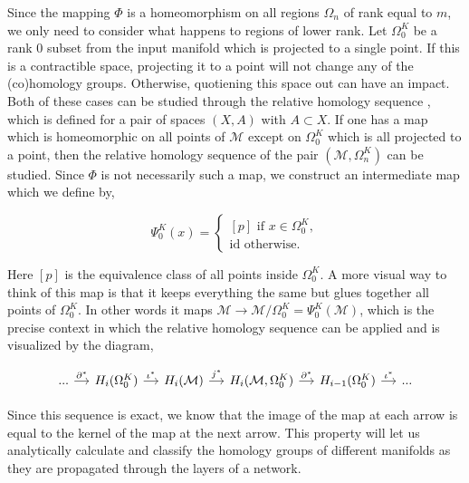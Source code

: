 Since the mapping $\Phi$ is a homeomorphism on all regions $\Omega_n$ of rank equal to $m$, we only need to consider what happens to regions of lower rank. Let $\Omega_0^K$ be a rank 0 subset from the input manifold which is projected to a single point. If this is a contractible space, projecting it to a point will not change any of the (co)homology groups. Otherwise, quotiening this space out can have an impact. Both of these cases can be studied through the relative homology sequence \cite{hatcher2005algebraic}, which is defined for a pair of spaces $(X,A)$ with $A \subset X$. If one has a map which is homeomorphic on all points of $\mathcal{M}$ except on $\Omega_0^K$ which is all projected to a point, then the relative homology sequence of the pair $(\mathcal{M}, \Omega_n^K)$ can be studied. Since $\Phi$ is not necessarily such a map, we construct an intermediate map which we define by,

\begin{equation}
    \Psi^K_0(x) = 
    \begin{cases}
        [p] \text{ if } x \in \Omega^K_0, \\
        \text{id otherwise.}  
    \end{cases}
\end{equation}

Here $[p]$ is the equivalence class of all points inside $\Omega^K_0$. A more visual way to think of this map is that it keeps everything the same but glues together all points of $\Omega^K_0$. In other words it maps $\mathcal{M} \to \mathcal{M} / \Omega^K_0 = \Psi_0^K(\mathcal{M})$, which is the precise context in which the relative homology sequence can be applied and is visualized by the diagram,

\begin{equation}
    \begin{tikzcd}[row sep=small,column sep=small]
        ... \arrow[r, "\partial^*"] & H_i(\Omega_0^K) \arrow[r, "\iota^*"] & H_i(\mathcal{M}) \arrow[r, "j^*"] & H_i(\mathcal{M},\Omega_0^K) \arrow[r, "\partial^*"] & H_{i-1}(\Omega_0^K) \arrow[r, "\iota^*"] & ...
    \end{tikzcd}
\end{equation}

Since this sequence is exact, we know that the image of the map at each arrow is equal to the kernel of the map at the next arrow. This property will let us analytically calculate and classify the homology groups of different manifolds as they are propagated through the layers of a network.

